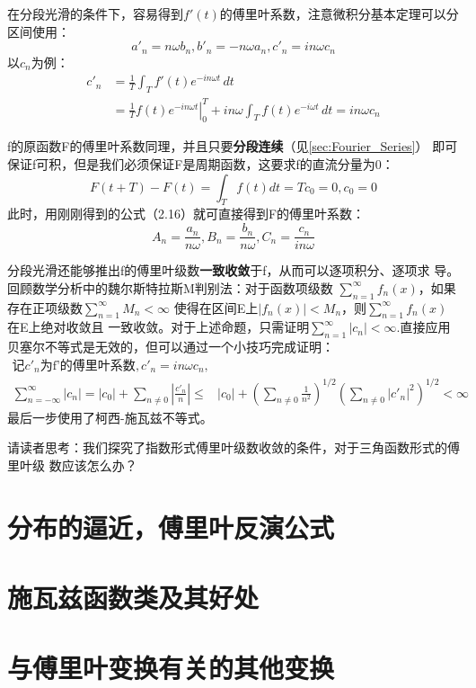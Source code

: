 \documentclass{ctexbook}
\begin{document}
在分段光滑的条件下，容易得到$f'(t)$的傅里叶系数，注意微积分基本定理可以分区间使用：
\begin{equation}
    a'_n=n\omega b_n,b'_n=-n\omega a_n,c'_n=in\omega c_n
\end{equation}
以$c_n$为例：
\begin{align*}
    c'_n & =\frac{1}{T}\int_{T}f'(t)e^{-in\omega t}\,dt                                                         \\
         & =\frac{1}{T}\left.f(t)e^{-in\omega t}\right|_0^T+in\omega\int_{T}f(t)e^{-i\omega t}\,dt=in\omega c_n
\end{align*}

f的原函数F的傅里叶系数同理，并且只要\textbf{分段连续}（见\ref{sec:Fourier_Series}）
即可保证f可积，但是我们必须保证F是周期函数，这要求f的直流分量为0：
\[F(t+T)-F(t)=\int_{T}f(t)dt=Tc_0=0,c_0=0\]
此时，用刚刚得到的公式（2.16）就可直接得到F的傅里叶系数：
\begin{equation}
    A_n=\frac{a_n}{n\omega},B_n=\frac{b_n}{n\omega},C_n=\frac{c_n}{in\omega}
\end{equation}

分段光滑还能够推出f的傅里叶级数\textbf{一致收敛}于f，从而可以逐项积分、逐项求
导。回顾数学分析中的魏尔斯特拉斯M判别法：对于函数项级数
$\sum_{n=1}^{\infty}f_n(x)$，如果存在正项级数$\sum_{n=1}^{\infty}M_n<\infty$
使得在区间E上$|f_n(x)|<M_n$，则$\sum_{n=1}^{\infty}f_n(x)$在E上绝对收敛且
一致收敛。对于上述命题，只需证明$\sum_{n=1}^{\infty}|c_n|<\infty$.直接应用
贝塞尔不等式是无效的，但可以通过一个小技巧完成证明：
\begin{align*}
    \text{记}c'_n\text{为f'的傅里叶系数},c'_n =in\omega c_n,                            &                                                                                \\
    \sum_{n=-\infty}^{\infty}|c_n|=   |c_0|+\sum_{n\neq 0}| \frac{c'_n}{n}|\leq & |c_0|+(\sum_{n\neq 0}\frac{1}{n^2})^{1/2}(\sum_{n\neq 0}|c'_n|^2)^{1/2}<\infty
\end{align*}
最后一步使用了柯西-施瓦兹不等式。

请读者思考：我们探究了指数形式傅里叶级数收敛的条件，对于三角函数形式的傅里叶级
数应该怎么办？

\section{分布的逼近，傅里叶反演公式}\label{sec:approach}

\section{施瓦兹函数类及其好处}\label{sec:Schwartz_Functions}

\section{与傅里叶变换有关的其他变换}\label{sec:Other_Transforms}
\end{document}
